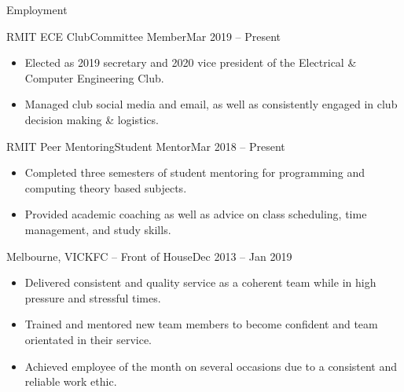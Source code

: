 \documentclass[]{mcdowellcv}
\begin{document}
	\begin{cvsection}{Employment}
		\begin{cvsubsection}{RMIT ECE Club}{Committee Member}{Mar 2019 -- Present}
			\begin{itemize}
				\item Elected as 2019 secretary and 2020 vice president of the Electrical \& Computer Engineering Club.
				\item Managed club social media and email, as well as consistently engaged in club decision making \& logistics.
			\end{itemize}
		\end{cvsubsection}

		\begin{cvsubsection}{RMIT Peer Mentoring}{Student Mentor}{Mar 2018 -- Present}
			\begin{itemize}
				\item Completed three semesters of student mentoring for programming and computing theory based subjects.
				\item Provided academic coaching as well as advice on class scheduling, time management, and study skills.
			\end{itemize}
		\end{cvsubsection}

		\begin{cvsubsection}{Melbourne, VIC}{KFC -- Front of House}{Dec 2013 -- Jan 2019}
			\begin{itemize}
				\item Delivered consistent and quality service as a coherent team while in high pressure and stressful times.
				\item Trained and mentored new team members to become confident and team orientated in their service.
				\item Achieved employee of the month on several occasions due to a consistent and reliable work ethic.
			\end{itemize}
		\end{cvsubsection}
	\end{cvsection}
\end{document}
